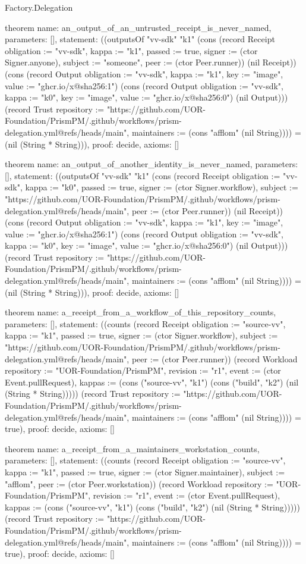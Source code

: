 \begin{lexlean}{Factory.Delegation}
\begin{semanticmodule}
theorem{
  name: an_output_of_an_untrusted_receipt_is_never_named,
  parameters: [],
  statement: ((outputsOf "vv-sdk" "k1" (cons (record Receipt {obligation := "vv-sdk", kappa := "k1", passed := true, signer := (ctor Signer.anyone), subject := "someone", peer := (ctor Peer.runner)}) (nil Receipt)) (cons (record Output {obligation := "vv-sdk", kappa := "k1", key := "image", value := "ghcr.io/x@sha256:1"}) (cons (record Output {obligation := "vv-sdk", kappa := "k0", key := "image", value := "ghcr.io/x@sha256:0"}) (nil Output))) (record Trust {repository := "https://github.com/UOR-Foundation/PrismPM/.github/workflows/prism-delegation.yml@refs/heads/main", maintainers := (cons "afflom" (nil String))})) = (nil (String * String))),
  proof: decide{},
  axioms: []
}

theorem{
  name: an_output_of_another_identity_is_never_named,
  parameters: [],
  statement: ((outputsOf "vv-sdk" "k1" (cons (record Receipt {obligation := "vv-sdk", kappa := "k0", passed := true, signer := (ctor Signer.workflow), subject := "https://github.com/UOR-Foundation/PrismPM/.github/workflows/prism-delegation.yml@refs/heads/main", peer := (ctor Peer.runner)}) (nil Receipt)) (cons (record Output {obligation := "vv-sdk", kappa := "k1", key := "image", value := "ghcr.io/x@sha256:1"}) (cons (record Output {obligation := "vv-sdk", kappa := "k0", key := "image", value := "ghcr.io/x@sha256:0"}) (nil Output))) (record Trust {repository := "https://github.com/UOR-Foundation/PrismPM/.github/workflows/prism-delegation.yml@refs/heads/main", maintainers := (cons "afflom" (nil String))})) = (nil (String * String))),
  proof: decide{},
  axioms: []
}

theorem{
  name: a_receipt_from_a_workflow_of_this_repository_counts,
  parameters: [],
  statement: ((counts (record Receipt {obligation := "source-vv", kappa := "k1", passed := true, signer := (ctor Signer.workflow), subject := "https://github.com/UOR-Foundation/PrismPM/.github/workflows/prism-delegation.yml@refs/heads/main", peer := (ctor Peer.runner)}) (record Workload {repository := "UOR-Foundation/PrismPM", revision := "r1", event := (ctor Event.pullRequest), kappas := (cons ("source-vv", "k1") (cons ("build", "k2") (nil (String * String))))}) (record Trust {repository := "https://github.com/UOR-Foundation/PrismPM/.github/workflows/prism-delegation.yml@refs/heads/main", maintainers := (cons "afflom" (nil String))})) = true),
  proof: decide{},
  axioms: []
}

theorem{
  name: a_receipt_from_a_maintainers_workstation_counts,
  parameters: [],
  statement: ((counts (record Receipt {obligation := "source-vv", kappa := "k1", passed := true, signer := (ctor Signer.maintainer), subject := "afflom", peer := (ctor Peer.workstation)}) (record Workload {repository := "UOR-Foundation/PrismPM", revision := "r1", event := (ctor Event.pullRequest), kappas := (cons ("source-vv", "k1") (cons ("build", "k2") (nil (String * String))))}) (record Trust {repository := "https://github.com/UOR-Foundation/PrismPM/.github/workflows/prism-delegation.yml@refs/heads/main", maintainers := (cons "afflom" (nil String))})) = true),
  proof: decide{},
  axioms: []
}


\end{semanticmodule}
\end{lexlean}
